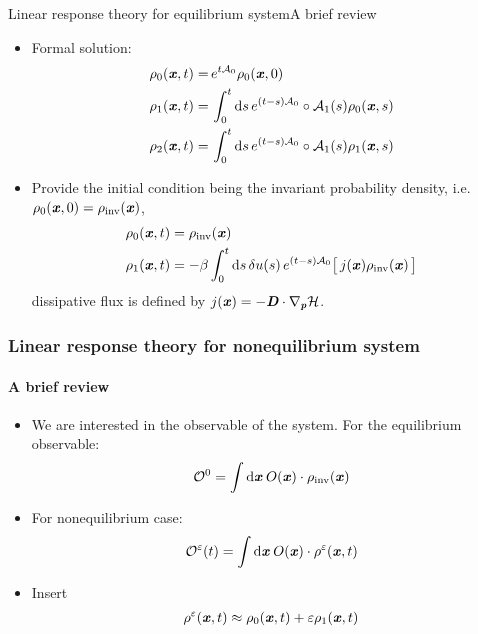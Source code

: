 \documentclass[fleqn]{beamer}
\newcommand{\bluec}[1]{{\color{blue} #1}}
\newcommand{\vect}[1]{\textbf{\textit{#1}}}
\newcommand{\dd}[0]{\textrm{d}}
\newcommand{\fe}{u}
\newcommand{\mh}{\mathcal H}
\newcommand{\eps}{\varepsilon}
\newcommand{\mo}{\mathcal O}
\newcommand{\fwg}{{\mathcal A}}
\newcommand{\inv}{{\textrm{inv}}}
\begin{document}
\begin{frame}{Linear response theory for equilibrium system}{A brief review}
  \begin{itemize}
  \item <1-> Formal solution:
    \bluec{
      \begin{align*}
        \rho_0(\vect x, t)
        =&\,
        e^{t\fwg_0}\rho_0(\vect x, 0) \\
        \rho_1(\vect x, t)
        =&\,
        \int_0^t\dd s\,
        e^{(t-s)\fwg_0}\circ
        \fwg_1(s) \rho_0(\vect x,s)\\
        \rho_2(\vect x, t)
        =&\,
        \int_0^t\dd s\,
        e^{(t-s)\fwg_0}\circ
        \fwg_1(s) \rho_1(\vect x,s) 
      \end{align*}
    }
  \item <2-> Provide the initial condition being the invariant probability density, i.e.
    \bluec{$\rho_0(\vect x, 0) = \rho_{\inv}(\vect x)$},
    \bluec{
      \begin{align*}
        \rho_0(\vect x, t) &= \rho_{\inv} (\vect x)\\
        \rho_1(\vect x, t) &=
        -\beta
        \int_0^t\dd s\,
        \delta\fe(s)\,
        e^{(t-s)\fwg_0}
        \big[\,
        j(\vect x)
        \rho_{\inv}(\vect x)
        \,\big]
      \end{align*}
    }
    {dissipative flux} is defined by \bluec{$j(\vect x)=-\vect D\cdot\nabla_{\vect p}\mh$}.
  \end{itemize}
\end{frame}


\begin{frame}
  \frametitle{Linear response theory for nonequilibrium system}
  \framesubtitle{A brief review}
  \begin{itemize}
  \item<1-> We are interested in the observable of the system. For the equilibrium observable:
    \bluec{
      \begin{align*}        
        \mo^0= \int\dd \vect x \:O(\vect x)\cdot \rho_\inv (\vect x)
      \end{align*}
    }
  \item <2-> For nonequilibrium case:
    \bluec{
      \begin{align*}
        \mo^\eps(t)= \int\dd \vect x \:O(\vect x)\cdot \rho^\eps(\vect x, t)
      \end{align*}}
  \item<3-> Insert
    \bluec{
      \begin{align*}
        \rho^\eps (\vect x, t) \approx \rho_0(\vect x, t) + \eps \rho_1(\vect x, t)        
      \end{align*}
    }
  \end{itemize}
\end{frame}
\end{document}
